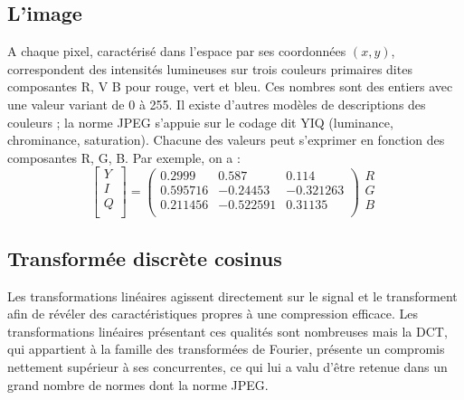 \documentclass[a4paper,10pt]{article}
\begin{document}
\subsection{L'image}

A chaque pixel, caractérisé dans l'espace par ses coordonnées $( x , y )$, correspondent des intensités lumineuses sur trois couleurs primaires dites composantes R, V B pour rouge, vert et bleu. Ces nombres sont des entiers avec une valeur variant de 0 à 255. Il existe d'autres modèles de descriptions des couleurs ; la norme JPEG s'appuie sur le codage dit YIQ \cite{YIQ} (luminance, chrominance, saturation). Chacune des valeurs peut s'exprimer en fonction des composantes R, G, B. Par exemple, on a :
\begin{equation}
\left[ 
\begin{array}{c}
Y \\ I \\ Q \\
\end{array}
\right] =
\left( \begin{array}{ccc}
0.2999 & 0.587 & 0.114 \\
0.595716 & -0.24453 & -0.321263 \\
0.211456 & -0.522591 & 0.31135 \\
\end{array} \right)
\begin{array}{c}
R \\ G \\ B \\
\end{array}
\end{equation}


\subsection{Transformée discrète cosinus}

Les transformations linéaires agissent directement sur le signal et le transforment afin de révéler des caractéristiques propres à une compression efficace. Les transformations linéaires présentant ces qualités sont nombreuses mais la DCT, qui appartient à la famille des transformées de Fourier, présente un compromis nettement supérieur à ses concurrentes, ce qui lui a valu d'être retenue dans un grand nombre de normes dont la norme JPEG.
\end{document}
